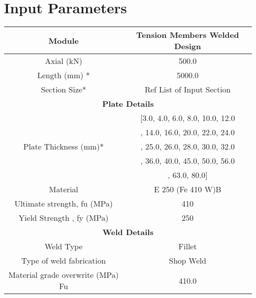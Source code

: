 \documentclass{article}%
\begin{document}
%
\normalsize%
\fontsize{8}{12}%
\selectfont%
\pagestyle{header}%
\section{Input Parameters}%
\label{sec:InputParameters}%
\renewcommand{\arraystretch}{1.2}%
\begin{longtable}{|p{5cm}|p{2cm}|p{2cm}|p{2cm}|p{5cm}|}%
\hline%
\hline%
\multicolumn{3}{|c|}{Module}&\multicolumn{2}{|c|}{Tension Members Welded Design}\\%
\hline%
\hline%
\multicolumn{3}{|c|}{Axial (kN)}&\multicolumn{2}{|c|}{500.0}\\%
\hline%
\hline%
\multicolumn{3}{|c|}{Length (mm) *}&\multicolumn{2}{|c|}{5000.0}\\%
\hline%
\hline%
\multicolumn{3}{|c|}{Section Size*}&\multicolumn{2}{|c|}{Ref List of Input Section}\\%
\hline%
\hline%
\multicolumn{5}{|c|}{\textbf{Plate Details}}\\%
\hline%
\multicolumn{3}{|c|}{\multirow{5}{*}{Plate Thickness (mm)*}}&\multicolumn{2}{|c|}{{[}3.0, 4.0, 6.0, 8.0, 10.0, 12.0}\\%
\multicolumn{3}{|c|}{\multirow{5}{*}{}}&\multicolumn{2}{|c|}{, 14.0, 16.0, 20.0, 22.0, 24.0}\\%
\multicolumn{3}{|c|}{\multirow{5}{*}{}}&\multicolumn{2}{|c|}{, 25.0, 26.0, 28.0, 30.0, 32.0}\\%
\multicolumn{3}{|c|}{\multirow{5}{*}{}}&\multicolumn{2}{|c|}{, 36.0, 40.0, 45.0, 50.0, 56.0}\\%
\multicolumn{3}{|c|}{\multirow{5}{*}{}}&\multicolumn{2}{|c|}{, 63.0, 80.0{]}}\\%
\hline%
\hline%
\multicolumn{3}{|c|}{Material}&\multicolumn{2}{|c|}{E 250 (Fe 410 W)B}\\%
\hline%
\hline%
\multicolumn{3}{|c|}{Ultimate strength, fu (MPa)}&\multicolumn{2}{|c|}{410}\\%
\hline%
\hline%
\multicolumn{3}{|c|}{Yield Strength , fy (MPa)}&\multicolumn{2}{|c|}{250}\\%
\hline%
\hline%
\multicolumn{5}{|c|}{\textbf{Weld Details}}\\%
\hline%
\hline%
\multicolumn{3}{|c|}{Weld Type}&\multicolumn{2}{|c|}{Fillet}\\%
\hline%
\hline%
\multicolumn{3}{|c|}{Type of weld fabrication}&\multicolumn{2}{|c|}{Shop Weld}\\%
\hline%
\hline%
\multicolumn{3}{|c|}{Material grade overwrite (MPa) Fu}&\multicolumn{2}{|c|}{410.0}\\%

\end{longtable}
\end{document}

